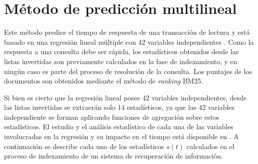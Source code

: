 \section{Método de predicción multilineal}
\label{scheduling:glasgow}
Este método predice el tiempo de respuesta de una transacción de lectura y está basado en una regresión lineal múltiple con 42 variables independientes \citep{Macdonald:2012}. Como la respuesta a una consulta debe ser rápida, los estadísticos obtenidos desde las listas invertidas son previamente calculados en la fase de indexamiento, y en ningún caso es parte del proceso de resolución de la consulta. Los puntajes de los documentos son obtenidos mediante el método de \textit{ranking} BM25. 

Si bien es cierto que la regresión lineal posee 42 variables independientes, desde las listas invertidas se extraerán solo 14 estadísticos, ya que las 42 variables independiente se forman aplicando funciones de agregación sobre estos estadísticos. El estudio y el análisis estadístico de cada una de las variables involucradas en la regresión y su impacto en el tiempo está disponible en \citep{Macdonald:2012, Hauff:2010, He:2004}. A continuación se describe cada uno de los estadísticos $s(t)$ calculados en el proceso de indexamiento \citep{Croft:2009} de un sistema de recuperación de información.


